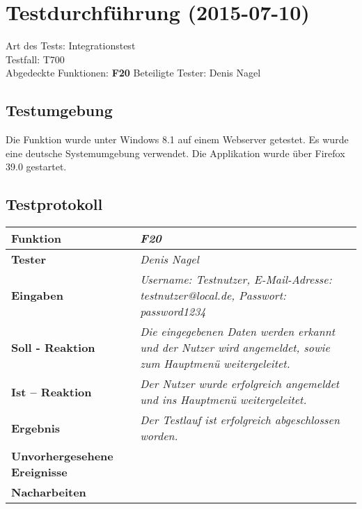 
\chapter{Testdurchführung (2015-07-10)}

Art des Tests: Integrationstest\\
Testfall: T700\\
Abgedeckte Funktionen: \textbf{F20}
Beteiligte Tester: Denis Nagel\\

\section{Testumgebung}

Die Funktion wurde unter Windows 8.1 auf einem Webserver  getestet. Es wurde eine deutsche Systemumgebung verwendet. Die Applikation wurde über Firefox 39.0 gestartet.

\section{Testprotokoll}

\begin{longtable}{|p{4cm}|p{11cm}|}
\hline
\textbf{Funktion} & \textit{\textbf{F20}} \\
\hline
\textbf{Tester} & \textit{Denis Nagel} \\
\hline
\textbf{Eingaben} & \textit{Username: Testnutzer, E-Mail-Adresse: testnutzer@local.de, Passwort: password1234} \\
\hline
\textbf{Soll - Reaktion} & \textit{Die eingegebenen Daten werden erkannt und der Nutzer wird angemeldet, sowie zum Hauptmenü weitergeleitet.} \\
\hline
\textbf{Ist -- Reaktion} & \textit{Der Nutzer wurde erfolgreich angemeldet und ins Hauptmenü weitergeleitet.} \\
\hline
\textbf{Ergebnis} & \textit{Der Testlauf ist erfolgreich abgeschlossen worden.} \\
\hline
\textbf{Unvorhergesehene Ereignisse} &
\textit{} \\
\hline
\textbf{Nacharbeiten } & \textit{} \\
\hline
\end{longtable}

